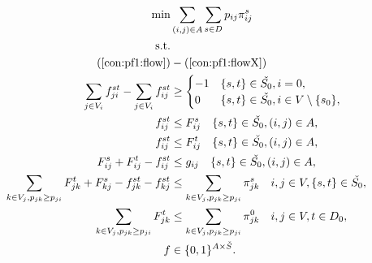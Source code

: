 \begin{subequations}[resume]
\begin{align}
\notag\min & \sum\limits_{(i,j) \in A} \sum\limits_{s \in D} p_{ij} \pi^s_{ij}\\ \notag
\text{s.t.}& && \\
\notag(\ref{con:pf1:flow}) &- (\ref{con:pf1:flowX})\\
\label{con:pf2:flowHook} \sum\limits_{\substack{ j \in V_i }}f^{st}_{ji}-\sum\limits_{\substack{j\in V_i}}f^{st}_{ij} & \geq 
  \begin{cases}
    -1 & \{s,t\}\in \check{S_0}, i = 0, \\
    0  & \{s,t\}\in \check{S_0}, i\in V\setminus \{s_0\},
  \end{cases}  \\
\label{con:pf2:startInSource}  f^{st}_{ij} & \leq F^s_{ij} \quad \{s,t\}\in \check{S_0}, (i,j)\in A,\\
\label{con:pf2:stopInDest}  f^{st}_{ij} & \leq F^t_{ij} \quad \{s,t\}\in \check{S_0}, (i,j)\in A,\\
\label{con:pf2:stronger}  F^{s}_{ij}+F^{t}_{ij}-f^{st}_{ij} &\leq g_{ij} \quad \{s,t\}\in \check{S_0}, (i,j)\in A,\\ 
\label{con:pf2:sumFImpSumY} \sum\limits_{k\in V_j, p_{jk}\geq p_{ji}}F^{t}_{jk} + F^{s}_{kj} - f^{st}_{jk} - f^{st}_{kj} & \leq \sum\limits_{k\in V_j, p_{jk}\geq p_{ji}}  \pi^{s}_{jk} \quad i,j\in V,\{s,t\}\in \check{S_0},\\
\label{con:pf2:sumFImpSumY2} \sum\limits_{k\in V_j, p_{jk}\geq p_{ji}}F^{t}_{jk} & \leq \sum\limits_{k\in V_j, p_{jk}\geq p_{ji}}  \pi^{0}_{jk} \quad i,j\in V, t\in D_0,\\
\label{con:pf2:dim} f&\in\{0,1\}^{A\times \check{S}}.
\end{align}~
\end{subequations}

